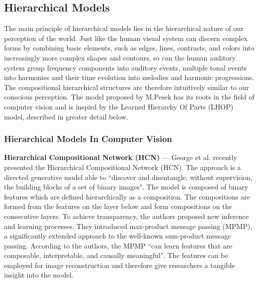 \documentclass[../main.tex]{subfiles}
\begin{document}


\subsection{Hierarchical Models}

The main principle of hierarchical models lies in the hierarchical nature of our perception of the world. Just like the human visual system can discern complex forms by combining basic elements, such as edges, lines, contrasts, and colors into increasingly more complex shapes and contours, so can the human auditory system group frequency components into auditory events, multiple tonal events into harmonies and their time evolution into melodies and harmonic progressions. The compositional hierarchical structures are therefore intuitively similar to our conscious perception. The model proposed by M.Pesek has its roots in the field of computer vision and is inspird by the Learned Hierarchy Of Parts (LHOP) model, described in greater detail below.

\subsubsection{Hierarchical Models In Computer Vision}
\noindent
\textbf{Hierarchical Compositional Network (HCN)} — George et al.\cite{Gredilla_Liu_Phoenix_George:1} recently presented the Hierarchical Compositional Network (HCN). The approach is a directed generative model able to ``discover and disentangle, without supervision, the building blocks of a set of binary images". The model is composed of binary features which are defined hierarchically as a composition. The compositions are formed from the features on the layer below and form compositions on the consecutive layers. To achieve transparency, the authors proposed new inference and learning processes. They introduced max-product message passing (MPMP), a significantly extended approach to the well-known sum-product message passing. According to the authors, the MPMP ``can learn features that are composable, interpretable, and causally meaningful". The features can be employed for image reconstruction and therefore give researchers a tangible insight into the model.
\end{document}
